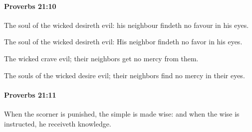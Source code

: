 		\paragraph{Proverbs 21:10} %
			\label{PROVERBS-21-10}

			The soul of the wicked desireth evil: his neighbour findeth no favour in his eyes.

			\begin{versebox}
					\item[BHS] 
					\item[ASV] The soul of the wicked desireth evil: His neighbor findeth no favor in his eyes.
					\item[NIV] The wicked crave evil; their neighbors get no mercy from them.
					\item[NRSV] The souls of the wicked desire evil; their neighbors find no mercy in their eyes.
			\end{versebox}

		\paragraph{Proverbs 21:11} %
			\label{PROVERBS-21-11}

			When the scorner is punished, the simple is made wise: and when the wise is instructed, he receiveth knowledge.

